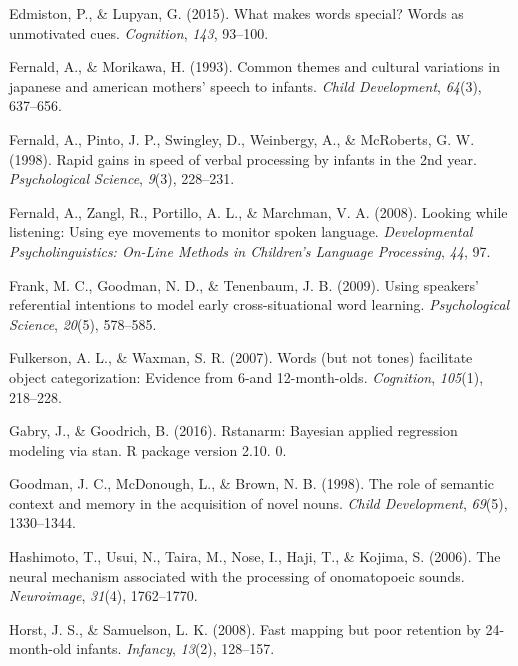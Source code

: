 \documentclass[english,floatsintext,man]{apa6}
\theoremstyle{definition}
\theoremstyle{definition}
\theoremstyle{definition}
\theoremstyle{remark}
\begin{document}
\leavevmode\hypertarget{ref-edmiston2015makes}{}%
Edmiston, P., \& Lupyan, G. (2015). What makes words special? Words as
unmotivated cues. \emph{Cognition}, \emph{143}, 93--100.

\leavevmode\hypertarget{ref-fernald1993common}{}%
Fernald, A., \& Morikawa, H. (1993). Common themes and cultural
variations in japanese and american mothers' speech to infants.
\emph{Child Development}, \emph{64}(3), 637--656.

\leavevmode\hypertarget{ref-fernald1998rapid}{}%
Fernald, A., Pinto, J. P., Swingley, D., Weinbergy, A., \& McRoberts, G.
W. (1998). Rapid gains in speed of verbal processing by infants in the
2nd year. \emph{Psychological Science}, \emph{9}(3), 228--231.

\leavevmode\hypertarget{ref-fernald2008looking}{}%
Fernald, A., Zangl, R., Portillo, A. L., \& Marchman, V. A. (2008).
Looking while listening: Using eye movements to monitor spoken language.
\emph{Developmental Psycholinguistics: On-Line Methods in Children's
Language Processing}, \emph{44}, 97.

\leavevmode\hypertarget{ref-frank2009using}{}%
Frank, M. C., Goodman, N. D., \& Tenenbaum, J. B. (2009). Using
speakers' referential intentions to model early cross-situational word
learning. \emph{Psychological Science}, \emph{20}(5), 578--585.

\leavevmode\hypertarget{ref-fulkerson2007words}{}%
Fulkerson, A. L., \& Waxman, S. R. (2007). Words (but not tones)
facilitate object categorization: Evidence from 6-and 12-month-olds.
\emph{Cognition}, \emph{105}(1), 218--228.

\leavevmode\hypertarget{ref-gabry2016rstanarm}{}%
Gabry, J., \& Goodrich, B. (2016). Rstanarm: Bayesian applied regression
modeling via stan. R package version 2.10. 0.

\leavevmode\hypertarget{ref-goodman1998role}{}%
Goodman, J. C., McDonough, L., \& Brown, N. B. (1998). The role of
semantic context and memory in the acquisition of novel nouns.
\emph{Child Development}, \emph{69}(5), 1330--1344.

\leavevmode\hypertarget{ref-hashimoto2006neural}{}%
Hashimoto, T., Usui, N., Taira, M., Nose, I., Haji, T., \& Kojima, S.
(2006). The neural mechanism associated with the processing of
onomatopoeic sounds. \emph{Neuroimage}, \emph{31}(4), 1762--1770.

\leavevmode\hypertarget{ref-horst2008fast}{}%
Horst, J. S., \& Samuelson, L. K. (2008). Fast mapping but poor
retention by 24-month-old infants. \emph{Infancy}, \emph{13}(2),
128--157.
\end{document}
